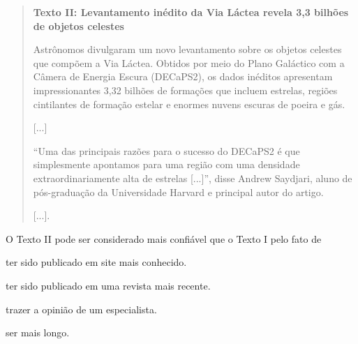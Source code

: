 \begin{quote}
\textbf{Texto II: Levantamento inédito da Via Láctea revela 3,3 bilhões
de objetos celestes}

Astrônomos divulgaram um novo levantamento sobre os objetos celestes
que compõem a Via Láctea. Obtidos por meio do Plano Galáctico com a
Câmera de Energia Escura (DECaPS2), os dados inéditos apresentam
impressionantes 3,32 bilhões de formações que incluem estrelas, regiões
cintilantes de formação estelar e enormes nuvens escuras de poeira e
gás.

{[}...{]}

``Uma das principais razões para o sucesso do DECaPS2 é que simplesmente
apontamos para uma região com uma densidade extraordinariamente alta de
estrelas {[}...{]}'', disse Andrew Saydjari, aluno de pós-graduação da
Universidade Harvard e principal autor do artigo.

{[}...{]}.

\end{quote}

O Texto II pode ser considerado mais confiável que o Texto I pelo fato de

\begin{escolha}
\item ter sido publicado em site mais conhecido.

\item ter sido publicado em uma revista mais recente.

\item trazer a opinião de um especialista.

\item ser mais longo.
\end{escolha}


